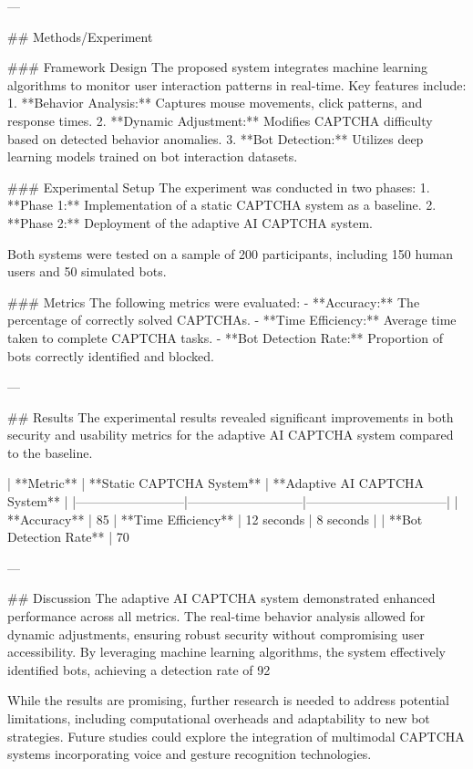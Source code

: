 ---

## Methods/Experiment

### Framework Design
The proposed system integrates machine learning algorithms to monitor user interaction patterns in real-time. Key features include:
1. **Behavior Analysis:** Captures mouse movements, click patterns, and response times.
2. **Dynamic Adjustment:** Modifies CAPTCHA difficulty based on detected behavior anomalies.
3. **Bot Detection:** Utilizes deep learning models trained on bot interaction datasets.

### Experimental Setup
The experiment was conducted in two phases:
1. **Phase 1:** Implementation of a static CAPTCHA system as a baseline.
2. **Phase 2:** Deployment of the adaptive AI CAPTCHA system.

Both systems were tested on a sample of 200 participants, including 150 human users and 50 simulated bots.

### Metrics
The following metrics were evaluated:
- **Accuracy:** The percentage of correctly solved CAPTCHAs.
- **Time Efficiency:** Average time taken to complete CAPTCHA tasks.
- **Bot Detection Rate:** Proportion of bots correctly identified and blocked.

---

## Results
The experimental results revealed significant improvements in both security and usability metrics for the adaptive AI CAPTCHA system compared to the baseline.

| **Metric**               | **Static CAPTCHA System** | **Adaptive AI CAPTCHA System** |
|--------------------------|---------------------------|---------------------------------|
| **Accuracy**             | 85%
| **Time Efficiency**      | 12 seconds               | 8 seconds                      |
| **Bot Detection Rate**   | 70%

---

## Discussion
The adaptive AI CAPTCHA system demonstrated enhanced performance across all metrics. The real-time behavior analysis allowed for dynamic adjustments, ensuring robust security without compromising user accessibility. By leveraging machine learning algorithms, the system effectively identified bots, achieving a detection rate of 92%

While the results are promising, further research is needed to address potential limitations, including computational overheads and adaptability to new bot strategies. Future studies could explore the integration of multimodal CAPTCHA systems incorporating voice and gesture recognition technologies.

